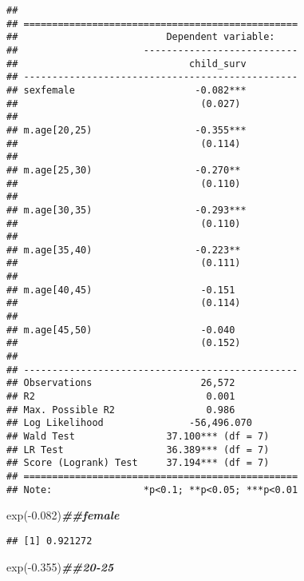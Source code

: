 \documentclass[
]{article}
\newenvironment{Shaded}{\begin{snugshade}}{\end{snugshade}}
\newcommand{\DocumentationTok}[1]{\textcolor[rgb]{0.56,0.35,0.01}{\textbf{\textit{#1}}}}
\newcommand{\FloatTok}[1]{\textcolor[rgb]{0.00,0.00,0.81}{#1}}
\newcommand{\FunctionTok}[1]{\textcolor[rgb]{0.00,0.00,0.00}{#1}}
\newcommand{\NormalTok}[1]{#1}
\newcommand{\SpecialCharTok}[1]{\textcolor[rgb]{0.00,0.00,0.00}{#1}}
\begin{document}
\begin{verbatim}
## 
## ================================================
##                          Dependent variable:    
##                      ---------------------------
##                              child_surv         
## ------------------------------------------------
## sexfemale                     -0.082***         
##                                (0.027)          
##                                                 
## m.age[20,25)                  -0.355***         
##                                (0.114)          
##                                                 
## m.age[25,30)                  -0.270**          
##                                (0.110)          
##                                                 
## m.age[30,35)                  -0.293***         
##                                (0.110)          
##                                                 
## m.age[35,40)                  -0.223**          
##                                (0.111)          
##                                                 
## m.age[40,45)                   -0.151           
##                                (0.114)          
##                                                 
## m.age[45,50)                   -0.040           
##                                (0.152)          
##                                                 
## ------------------------------------------------
## Observations                   26,572           
## R2                              0.001           
## Max. Possible R2                0.986           
## Log Likelihood               -56,496.070        
## Wald Test                37.100*** (df = 7)     
## LR Test                  36.389*** (df = 7)     
## Score (Logrank) Test     37.194*** (df = 7)     
## ================================================
## Note:                *p<0.1; **p<0.05; ***p<0.01
\end{verbatim}

\begin{Shaded}
\begin{Highlighting}[]
\FunctionTok{exp}\NormalTok{(}\SpecialCharTok{{-}}\FloatTok{0.082}\NormalTok{)}\DocumentationTok{\#\#female}
\end{Highlighting}
\end{Shaded}

\begin{verbatim}
## [1] 0.921272
\end{verbatim}

\begin{Shaded}
\begin{Highlighting}[]
\FunctionTok{exp}\NormalTok{(}\SpecialCharTok{{-}}\FloatTok{0.355}\NormalTok{)}\DocumentationTok{\#\#20{-}25}
\end{Highlighting}
\end{Shaded}
\end{document}
